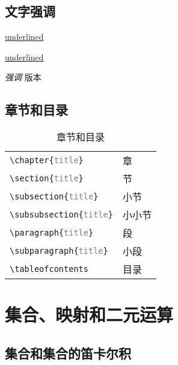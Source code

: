 \section{文字强调}

\underline{underlined} %

\uline{underlined}     %

\emph{强调} 版本

\section{章节和目录}

\begin{table}[h]
\caption{章节和目录}
\begin{center}
\begin{tabular}{l l}
	\hline
	\texttt{\textbackslash chapter\{\textcolor{gray}{title}\}}       & 章 \\
	\texttt{\textbackslash section\{\textcolor{gray}{title}\}}       & 节 \\
	\texttt{\textbackslash subsection\{\textcolor{gray}{title}\}}    & 小节 \\
	\texttt{\textbackslash subsubsection\{\textcolor{gray}{title}\}} & 小小节 \\
	\texttt{\textbackslash paragraph\{\textcolor{gray}{title}\}}     & 段 \\
	\texttt{\textbackslash subparagraph\{\textcolor{gray}{title}\}}  & 小段 \\
	\texttt{\textbackslash tableofcontents}                          & 目录 \\
	\hline
\end{tabular}
\end{center}
\end{table}

\chapter{集合、映射和二元运算}

\section{集合和集合的笛卡尔积}

